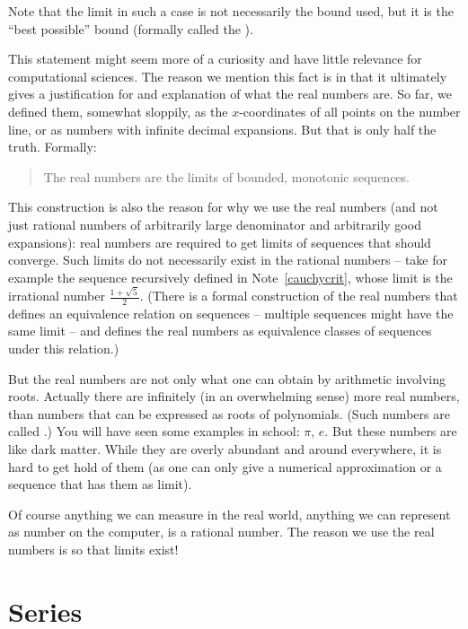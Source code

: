 Note that the limit in such a case is not necessarily the bound used, but it is the
``best possible'' bound (formally called the ).
\medskip

This statement might seem more of a curiosity and have little relevance for
computational sciences. The reason we mention this fact is in that it ultimately gives a
justification for and explanation of what the real numbers are. So far, we defined
them, somewhat sloppily, as the $x$-coordinates of all points on the number line, or as
numbers with infinite decimal expansions. But that is
only half the truth. Formally:

\begin{quote}
The real numbers are the limits of bounded, monotonic sequences.
\end{quote}

This construction is also the reason for why we use the real numbers (and not
just rational numbers of arbitrarily large denominator and arbitrarily good
expansions): real numbers are required to get limits of sequences that should
converge. Such limits do not necessarily exist in the rational numbers --
take for example the sequence recursively defined in Note~\ref{cauchycrit},
whose limit is the irrational number $\frac{1+\sqrt{5}}{2}$.  (There is a
formal construction of the real numbers that defines an equivalence relation
on sequences -- multiple sequences might have the same limit -- and defines
the real numbers as equivalence classes of sequences under this relation.)

But the real numbers are not only what one can obtain by arithmetic involving
roots.  Actually there are infinitely (in an overwhelming sense) more real
numbers, than numbers that can be expressed as roots of polynomials. (Such
numbers are called .) You will have seen some examples
in school: $\pi$, $e$. But these numbers are like dark matter. While they are
overly abundant and around everywhere, it is hard to get hold of them (as one
can only give a numerical approximation or a sequence that has them as limit).
\smallskip

Of course anything we can measure in the real world, anything we can represent as number
on the computer, is a rational number. The reason we use the real numbers is so that
limits exist!

\section{Series}

